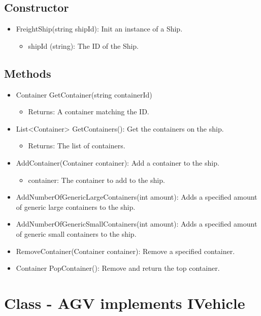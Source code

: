 \documentclass[12pt]{article}
\begin{document}
\subsection*{Constructor}
\begin{itemize}
    \item FreightShip(string shipId): Init an instance of a Ship.
    \begin{itemize}
        \item shipId (string): The ID of the Ship.
    \end{itemize}
\end{itemize}

\subsection*{Methods}
\begin{itemize}
    \item Container GetContainer(string containerId)
    \begin{itemize}
        \item Returns: A container matching the ID.
    \end{itemize}
    \item List<Container> GetContainers(): Get the containers on the ship.
    \begin{itemize}
        \item Returns: The list of containers.
    \end{itemize}
    \item AddContainer(Container container): Add a container to the ship.
    \begin{itemize}
        \item container: The container to add to the ship.
    \end{itemize}
    \item AddNumberOfGenericLargeContainers(int amount): Adds a specified amount of generic large containers to the ship.
    \item AddNumberOfGenericSmallContainers(int amount): Adds a specified amount of generic small containers to the ship.
    \item RemoveContainer(Container container): Remove a specified container.
    \item Container PopContainer(): Remove and return the top container.
\end{itemize}

\newpage
\section*{Class - AGV implements IVehicle}
\end{document}
